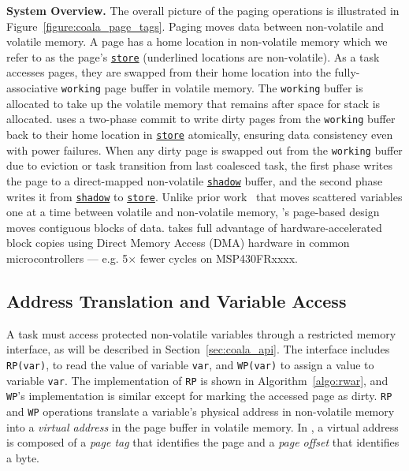 \textbf{System Overview.} The overall picture of the paging operations is illustrated in Figure~\ref{figure:coala_page_tags}. Paging moves data between non-volatile and volatile memory. A page has a home location in non-volatile memory which we refer to as the page's \texttt{\underline{store}} (underlined locations are non-volatile).
As a task accesses pages, they are swapped from their home location
into the fully\hyp{}associative \texttt{working} page buffer in volatile memory. The \texttt{working} buffer is allocated to take up the volatile memory that remains after space for stack is allocated.
%
\sys uses a two-phase commit to write dirty pages from the \texttt{working} buffer back to their home location in \texttt{\underline{store}} atomically, ensuring data consistency even with power failures.
%
When any dirty page is swapped out from the \texttt{working} buffer due to eviction or task transition from last coalesced task, the first phase writes the page to a direct\hyp{}mapped non-volatile \texttt{\underline{shadow}} buffer, and the second phase writes it from \texttt{\underline{shadow}} to \texttt{\underline{store}}.
%
Unlike prior work~\cite{chain,alpaca} that moves scattered variables one at a time between volatile and non-volatile memory, \sys's page-based design moves contiguous blocks of data.
%
\sys takes full advantage of hardware\hyp{}accelerated block copies using Direct Memory Access (DMA) hardware in common microcontrollers --- e.g. 5$\times$ fewer cycles on MSP430FRxxxx.

\subsection{Address Translation and Variable Access}

A \sys task must access protected non-volatile variables through a restricted memory interface, as will be described in Section~\ref{sec:coala_api}. The interface includes \texttt{RP(var)}, to read the value of variable {\tt var}, and \texttt{WP(var)} to assign a value to variable {\tt var}. The implementation of {\tt RP} is shown in Algorithm~\ref{algo:rwar}, and {\tt WP}'s implementation is similar except for marking the accessed page as dirty.
%
{\tt RP} and {\tt WP} operations translate a variable's physical address in non-volatile memory into a \emph{virtual address} in the page buffer in volatile memory. In \sys, a virtual address is composed of a \emph{page tag} that identifies the page and a \emph{page offset} that identifies a byte.

